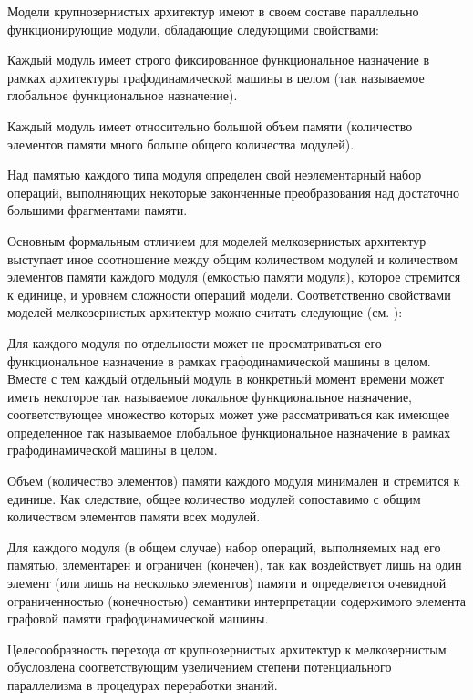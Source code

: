 Модели крупнозернистых архитектур имеют в своем составе параллельно функционирующие модули, обладающие следующими свойствами: 
\begin{textitemize}
	\item Каждый модуль имеет строго фиксированное функциональное назначение в рамках архитектуры графодинамической машины в целом (так называемое глобальное функциональное назначение).
	\item Каждый модуль имеет относительно большой объем памяти (количество элементов памяти много больше общего количества модулей).
	\item Над памятью каждого типа модуля определен свой неэлементарный набор операций, выполняющих некоторые законченные преобразования над достаточно большими фрагментами памяти.
\end{textitemize}

Основным формальным отличием для моделей мелкозернистых архитектур выступает иное соотношение между общим количеством модулей и количеством элементов памяти каждого модуля (емкостью памяти модуля), которое стремится к единице, и уровнем сложности операций модели. Соответственно свойствами моделей мелкозернистых архитектур можно считать следующие (см. ):
\begin{textitemize}
\item Для каждого модуля по отдельности может не просматриваться его функциональное назначение в рамках графодинамической машины в целом. Вместе с тем каждый отдельный модуль в конкретный момент времени может иметь некоторое так называемое локальное функциональное назначение, соответствующее множество которых может уже рассматриваться как имеющее определенное так называемое глобальное функциональное назначение в рамках графодинамической машины в целом.
\item Объем (количество элементов) памяти каждого модуля минимален и стремится к единице. Как следствие, общее количество модулей сопоставимо с общим количеством элементов памяти всех модулей.
\item Для каждого модуля (в общем случае) набор операций, выполняемых над его памятью, элементарен и ограничен (конечен), так как воздействует лишь на один элемент (или лишь на несколько элементов) памяти и определяется очевидной ограниченностью (конечностью) семантики интерпретации содержимого элемента графовой памяти графодинамической машины.
\end{textitemize}

Целесообразность перехода от крупнозернистых архитектур к мелкозернистым обусловлена  соответствующим увеличением степени потенциального параллелизма в процедурах переработки знаний.


